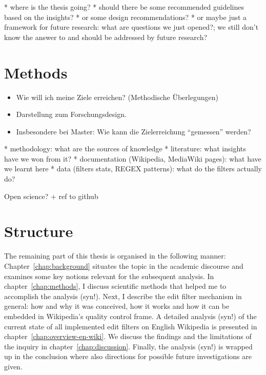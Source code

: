 
* where is the thesis going?
  * should there be some recommended guidelines based on the insights?
  * or some design recommendations?
  * or maybe just a framework for future research: what are questions we just opened?; we still don't know the answer to and should be addressed by future research?


\section{Methods}
\begin{itemize}
	\item Wie will ich meine Ziele erreichen? (Methodische Überlegungen)
	\item Darstellung zum Forschungsdesign.
	\item Insbesondere bei Master: Wie kann die Zielerreichung ``gemessen'' werden?
\end{itemize}

* methodology: what are the sources of knowledge
  * literature: what insights have we won from it?
  * documentation (Wikipedia, MediaWiki pages): what have we learnt here
  * data (filters stats, REGEX patterns): what do the filters actually do?

Open science? + ref to github

\section{Structure}

The remaining part of this thesis is organised in the following manner:
Chapter~\ref{chap:background} situates the topic in the academic discourse and examines some key notions relevant for the subsequent analysis.
In chapter~\ref{chap:methods}, I discuss scientific methods that helped me to accomplish the analysis (syn!).
Next, I describe the edit filter mechanism in general: how and why it was conceived, how it works and how it can be embedded in Wikipedia's quality control frame.
A detailed analysis (syn!) of the current state of all implemented edit filters on English Wikipedia is presented in chapter~\ref{chap:overview-en-wiki}.
We discuss the findings and the limitations of the inquiry in chapter~\ref{chap:discussion}.
Finally, the analysis (syn!) is wrapped up in the conclusion where also directions for possible future investigations are given.

